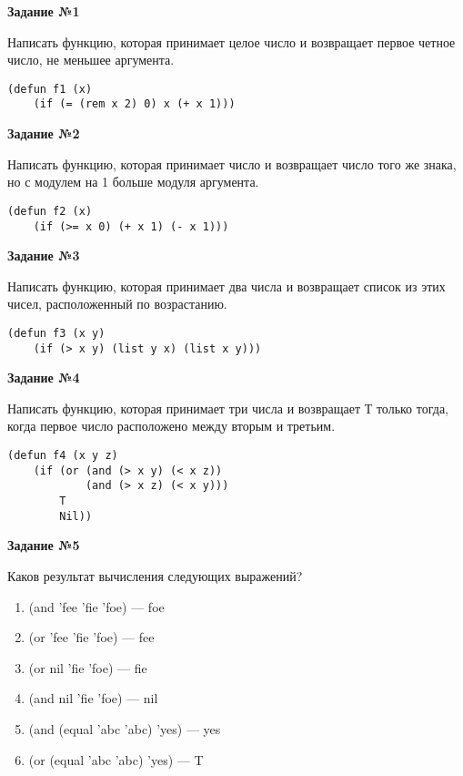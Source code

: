 \textbf{Задание №1}

Написать функцию, которая принимает целое число и возвращает первое
четное число, не меньшее аргумента.
\begin{center}
    \captionsetup{justification=raggedright,singlelinecheck=off}
    \begin{lstlisting}[label=lst:task_1,caption=Код функции]
    (defun f1 (x)
    (if (= (rem x 2) 0) x (+ x 1)))
\end{lstlisting}
\end{center}

\textbf{Задание №2}

Написать функцию, которая принимает число и возвращает число
того же знака, но с модулем на 1 больше модуля аргумента.
\begin{center}
    \captionsetup{justification=raggedright,singlelinecheck=off}
    \begin{lstlisting}[label=lst:task_2,caption=Код функции]
    (defun f2 (x)
    (if (>= x 0) (+ x 1) (- x 1)))
\end{lstlisting}
\end{center}

\textbf{Задание №3}

Написать функцию, которая принимает два числа и возвращает
список из этих чисел, расположенный по возрастанию.
\begin{center}
    \captionsetup{justification=raggedright,singlelinecheck=off}
    \begin{lstlisting}[label=lst:task_3,caption=Код функции]
    (defun f3 (x y)
    (if (> x y) (list y x) (list x y)))
\end{lstlisting}
\end{center}

\textbf{Задание №4}

Написать функцию, которая принимает три числа и возвращает Т только
тогда, когда первое число расположено между вторым и третьим.
\begin{center}
    \captionsetup{justification=raggedright,singlelinecheck=off}
    \begin{lstlisting}[label=lst:task_4,caption=Код функции]
    (defun f4 (x y z)
    (if (or (and (> x y) (< x z))
            (and (> x z) (< x y)))
        T
        Nil))
\end{lstlisting}
\end{center}

\clearpage
\textbf{Задание №5}

Каков результат вычисления следующих выражений?
\begin{enumerate}
    \item (and 'fee 'fie 'foe) --- foe
    \item (or 'fee 'fie 'foe) --- fee
    \item (or nil 'fie 'foe) --- fie
    \item (and nil 'fie 'foe) --- nil
    \item (and (equal 'abc 'abc) 'yes) --- yes
    \item (or (equal 'abc 'abc) 'yes) --- T
\end{enumerate}

